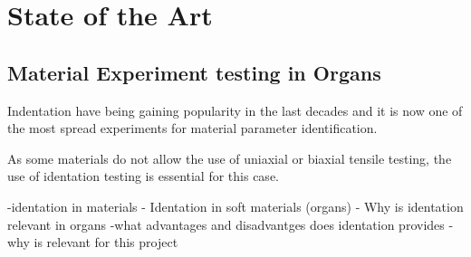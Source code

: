 
\chapter{State of the Art} %

\label{Chapter2} %


\section{Material Experiment testing in Organs}

Indentation have being gaining popularity in the last decades and it is now one of
 the most spread experiments for material parameter identification.

As some materials do not allow the use of uniaxial or biaxial tensile testing, the
 use of identation testing is essential for this case. 

-identation in materials
- Identation in soft materials (organs)
- Why is identation relevant in organs
-what advantages and disadvantges does identation provides
-why is relevant for this project 

